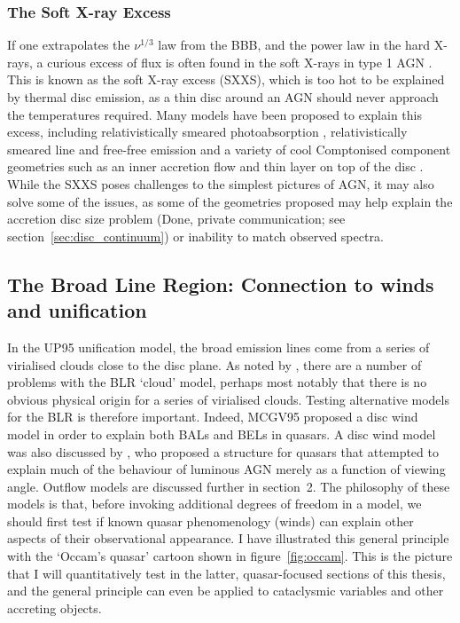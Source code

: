 \subsubsection{The Soft X-ray Excess}
\label{sec:sxxs}

If one extrapolates the $\nu^{1/3}$ law from the BBB, and the power law
in the hard X-rays, a curious excess of flux is often found in the soft X-rays
in type 1 AGN \citep[see figure~\ref{fig:quasar_sed}, and][]{koratkar1999}. 
This is known as the soft X-ray excess (SXXS), which is too 
hot to be explained by thermal disc emission, as a thin disc around an AGN should
never approach the temperatures required. Many models have been proposed to
explain this excess, including relativistically smeared 
photoabsorption \citep{gierlinskidone2004b,gierlinskidone2006}, 
relativistically smeared line and free-free emission \citep{rossfabian2005} 
and a variety of cool Comptonised component geometries such as an 
inner accretion flow \citep{magdiarz1998,done2012} 
and thin layer on top of the disc \citep{januik2001}. 
While the SXXS poses challenges to
the simplest pictures of AGN, it may also solve some of the issues, as
some of the geometries proposed may help explain the 
accretion disc size problem (Done, private communication; 
see section~\ref{sec:disc_continuum})
or inability to match observed spectra.

\subsection{The Broad Line Region: Connection to winds and unification}

In the UP95 unification model, the broad emission lines
come from a series of virialised clouds close to the disc plane.
As noted by \cite[][hereafter MCGV95]{MCGV95}, there are a number of problems with
the BLR `cloud' model, perhaps most notably that there is no obvious 
physical origin for a series of virialised clouds. 
Testing alternative models for the BLR is therefore important.
Indeed, MCGV95 proposed a disc wind model in order to explain both BALs and BELs
in quasars. A disc wind model was also  discussed by \cite{elvis2000}, 
who proposed a structure for quasars that attempted to explain much 
of the behaviour of luminous AGN
merely as a function of viewing angle. Outflow models are discussed further in section~2.
The philosophy of these models is that, before invoking additional
degrees of freedom in a model, we should first test if known quasar phenomenology 
(winds) can explain other aspects of their observational appearance.
I have illustrated this general principle with the `Occam's quasar' 
cartoon shown in figure~\ref{fig:occam}. This is the picture that I will
quantitatively test in the latter, quasar-focused sections of this thesis, and the general
principle can even be applied to cataclysmic variables and other accreting objects.


